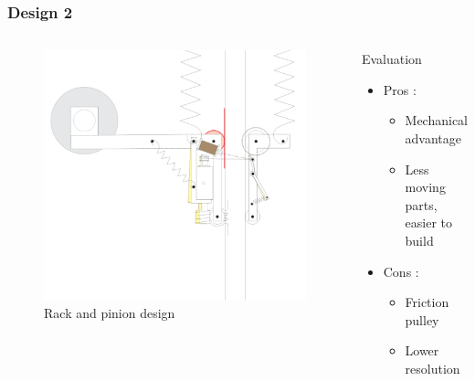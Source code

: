\begin{frame}
\begin{columns}
\end{columns}
\end{frame}

\begin{frame}
\frametitle{Design 2}
\begin{columns}
\begin{figure}
\centering
\includegraphics[width=\textwidth]{fig/seth_design.pdf}
\caption{Rack and pinion design}
\end{figure}

\begin{block}{Evaluation}
\begin{itemize}
\item
{\greencol Pros :}\\[0.1in]
    \begin{itemize}
    \item
    Mechanical advantage\\[0.1in]
    \item
    Less moving parts, easier to build\\[0.1in]
    \end{itemize}
\item
\alert{Cons} :\\[0.1in]
    \begin{itemize}
    \item
    Friction pulley\\[0.1in]
    \item
    Lower resolution\\[0.1in]
    \end{itemize}
\end{itemize}
\end{block}
\end{columns}
\end{frame}

